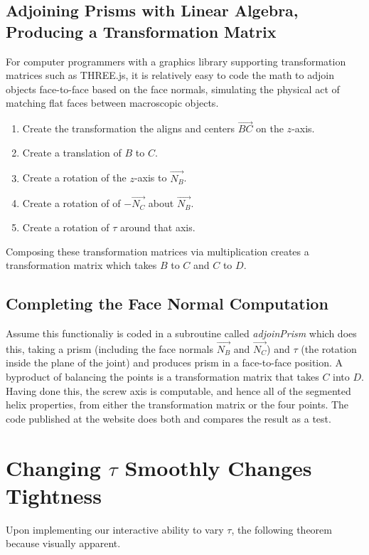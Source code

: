 \documentclass[11pt]{article}
\begin{document}
{\subsection{Adjoining Prisms with Linear Algebra, Producing a Transformation Matrix}
\label{sec:adjoin}

For computer programmers with a graphics library supporting transformation matrices such
as THREE.js\cite{dirksen2013learning},
it is relatively easy to code the math to adjoin objects
face-to-face based on the face normals, simulating the physical act of
matching flat faces between macroscopic objects.
\begin{enumerate}
  \item Create the transformation the aligns and centers $\overrightarrow{BC}$ on the $z$-axis.
\item Create a translation of $B$ to $C$.
\item Create a rotation of the $z$-axis to  $\overrightarrow{N_B}$.
\item Create a rotation of of $-\overrightarrow{N_C}$ about $\overrightarrow{N_B}$.
  \item Create a rotation of $\tau$ around that axis.
\end{enumerate}
Composing these transformation matrices via multiplication creates a
transformation matrix which takes $B$ to $C$ and $C$ to $D$.

\subsection{Completing the Face Normal Computation}
Assume this functionaliy
is coded in a subroutine called {\em adjoinPrism} which does this, taking a prism
(including the face normals $\overrightarrow{N_B}$ and $\overrightarrow{N_C}$) and $\tau$
(the rotation inside the plane of the joint) and produces prism
in a face-to-face position. A byproduct
of balancing the points is a transformation matrix
that takes $C$ into $D$. Having done this, the screw axis is computable,
and hence all of the segmented helix properties,
from either the transformation matrix or the four points.
The code published at the website does both and compares the result as a test.

\section{Changing $\tau$ Smoothly Changes Tightness}

Upon implementing our interactive ability to vary $\tau$, the following
theorem because visually apparent.

}
\end{document}
